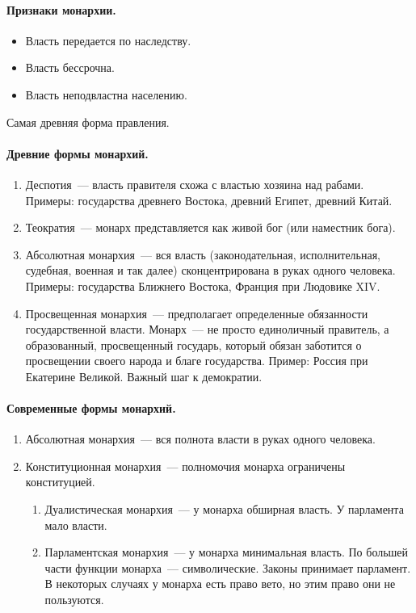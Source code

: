 \documentclass{article}
\begin{document}
	\paragraph{Признаки монархии.}
	\begin{itemize}
		\item Власть передается по наследству.
		\item Власть бессрочна.
		\item Власть неподвластна населению.
	\end{itemize}
	\begin{note}
		Самая древняя форма правления.
	\end{note}
	\paragraph{Древние формы монархий.}
	\begin{enumerate}
		\item Деспотия~--- власть правителя схожа с властью хозяина над рабами. Примеры: государства древнего Востока, древний Египет, древний Китай.
		\item Теократия~--- монарх представляется как живой бог (или наместник бога).
		\item Абсолютная монархия~--- вся власть (законодательная, исполнительная, судебная, военная и так далее) сконцентрирована в руках одного человека. Примеры: государства Ближнего Востока, Франция при Людовике XIV.
		\item Просвещенная монархия~--- предполагает определенные обязанности государственной власти. Монарх~--- не просто единоличный правитель, а образованный, просвещенный государь, который обязан заботится о просвещении своего народа и благе государства. Пример: Россия при Екатерине Великой. Важный шаг к демократии.
	\end{enumerate}
	\paragraph{Современные формы монархий.}
	\begin{enumerate}
		\item Абсолютная монархия~--- вся полнота власти в руках одного человека.
		\item Конституционная монархия~--- полномочия монарха ограничены конституцией.
		\begin{enumerate}
			\item Дуалистическая монархия~--- у монарха обширная власть. У парламента мало власти.
			\item Парламентская монархия~--- у монарха минимальная власть. По большей части функции монарха~--- символические. Законы принимает парламент. В некоторых случаях у монарха есть право вето, но этим право они не пользуются.
		\end{enumerate}
	\end{enumerate}
\end{document}
